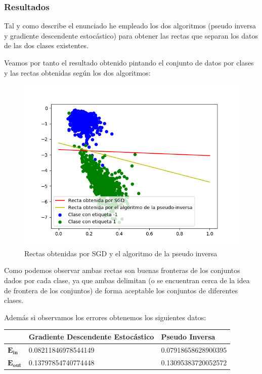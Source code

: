 \documentclass[12pt,a4paper]{article}
\begin{document}
\subsubsection{Resultados}

Tal y como describe el enunciado he empleado los dos algoritmos (pseudo inversa y gradiente descendente estocástico) para obtener las rectas que separan los datos de las dos clases existentes.

Veamos por tanto el resultado obtenido pintando el conjunto de datos por clases y las rectas obtenidas según los dos algoritmos:

\begin{figure}[H]
	\centering
	\includegraphics[scale=0.8]{./Imagenes/ej2-1_w.png}
	\caption{Rectas obtenidas por SGD y el algoritmo de la pseudo inversa}
	\label{ej2-1_w}
\end{figure}

Como podemos observar ambas rectas son buenas fronteras de los conjuntos dados por cada clase, ya que ambas delimitan (o se encuentran cerca de la idea de frontera de los conjuntos) de forma aceptable los conjuntos de diferentes clases.

Además si observamos los errores obtenemos los siguientes datos:

\begin{table}[H]
	\begin{tabular}{|l|l|l|}
		\hline
		& \textbf{Gradiente Descendente Estocástico} & \textbf{Pseudo Inversa}      \\ \hline \hline
		$\mathbf{E_{in}}$  & 0.08211846978544149               & 0.07918658628900395 \\ \hline
		$\mathbf{E_{out}}$ & 0.13797854740774448               & 0.13095383720052572 \\ \hline
	\end{tabular}
\end{table}
\end{document}
